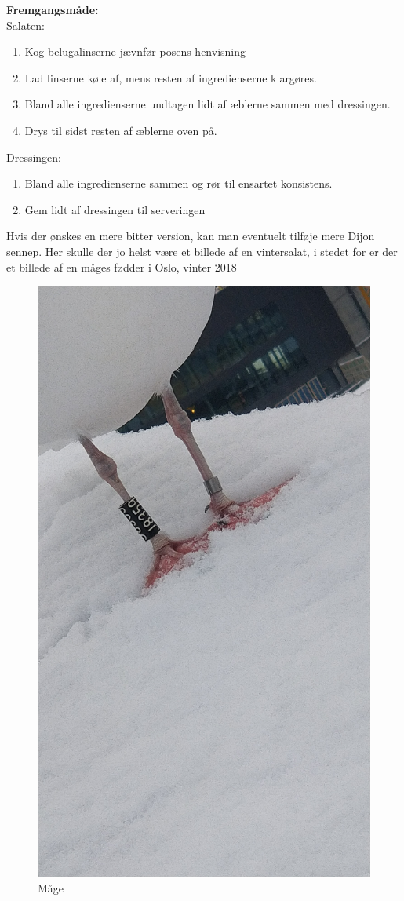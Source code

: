 \documentclass{book}
\begin{document}
\begin{minipage}[t]{0.5\textwidth} 
\textbf{Fremgangsmåde:}
\\ Salaten:
\begin{enumerate}
    \item Kog belugalinserne jævnfør posens henvisning
    \item Lad linserne køle af, mens resten af ingredienserne klargøres.
    \item Bland alle ingredienserne undtagen lidt af æblerne sammen med dressingen.
    \item Drys til sidst resten af æblerne oven på.
\end{enumerate}
Dressingen:
\begin{enumerate}
    \item Bland alle ingredienserne sammen og rør til ensartet konsistens.
    \item Gem lidt af dressingen til serveringen
\end{enumerate}
\end{minipage}
Hvis der ønskes en mere bitter version, kan man eventuelt tilføje mere Dijon sennep.
\newpage  Her skulle der jo helst være et billede af en vintersalat, i stedet for er der et billede af en måges fødder i Oslo, vinter 2018
\begin{figure}
    \centering
    \includegraphics[width=0.5\linewidth]{Billeder/Arbitær/Måge.jpg}
    \caption{Måge}
    
\end{figure}
\end{document}
